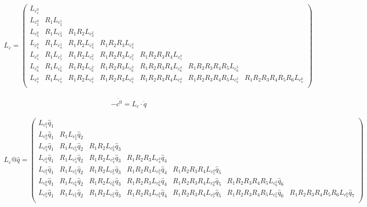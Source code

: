 {\begin{align*}
    L_c =
    \begin{pmatrix}
        L_{c_1^0} &               &                   &                       &                           &                               &   \\
        L_{c_2^0} & R_1 L_{c_2^1} &                   &                       &                           &                               &   \\
        L_{c_3^0} & R_1 L_{c_3^1} & R_1 R_2 L_{c_3^2} &                       &                           &                               &   \\
        L_{c_4^0} & R_1 L_{c_4^1} & R_1 R_2 L_{c_4^2} & R_1 R_2 R_3 L_{c_4^3} &                           &                               &   \\
        L_{c_5^0} & R_1 L_{c_5^1} & R_1 R_2 L_{c_5^2} & R_1 R_2 R_3 L_{c_5^3} & R_1 R_2 R_3 R_4 L_{c_5^4} &                               &   \\
        L_{c_6^0} & R_1 L_{c_6^1} & R_1 R_2 L_{c_6^2} & R_1 R_2 R_3 L_{c_6^3} & R_1 R_2 R_3 R_4 L_{c_6^4} & R_1 R_2 R_3 R_4 R_5 L_{c_6^5} &   \\
        L_{c_7^0} & R_1 L_{c_7^1} & R_1 R_2 L_{c_7^2} & R_1 R_2 R_3 L_{c_7^3} & R_1 R_2 R_3 R_4 L_{c_7^4} & R_1 R_2 R_3 R_4 R_5 L_{c_7^5} & R_1 R_2 R_3 R_4 R_5 R_6 L_{c_7^6} \\
    \end{pmatrix}
\end{align*}

\begin{align*}
    - \dot{c^0} = L_c \cdot \dot{q}
\end{align*}


\begin{align*}
    L_c @ \hat{q} =
    \begin{pmatrix}
        L_{c_1^0} \hat{q}_1 & & & & & &   \\
        L_{c_2^0} \hat{q}_1 & R_1 L_{c_2^1} \hat{q}_2 & & & & &   \\
        L_{c_3^0} \hat{q}_1 & R_1 L_{c_3^1} \hat{q}_2 & R_1 R_2 L_{c_3^2} \hat{q}_3 & & & &   \\
        L_{c_4^0} \hat{q}_1 & R_1 L_{c_4^1} \hat{q}_2 & R_1 R_2 L_{c_4^2} \hat{q}_3 & R_1 R_2 R_3 L_{c_4^3} \hat{q}_4 & & &   \\
        L_{c_5^0} \hat{q}_1 & R_1 L_{c_5^1} \hat{q}_2 & R_1 R_2 L_{c_5^2} \hat{q}_3 & R_1 R_2 R_3 L_{c_5^3} \hat{q}_4 & R_1 R_2 R_3 R_4 L_{c_5^4} \hat{q}_5 & &   \\
        L_{c_6^0} \hat{q}_1 & R_1 L_{c_6^1} \hat{q}_2 & R_1 R_2 L_{c_6^2} \hat{q}_3 & R_1 R_2 R_3 L_{c_6^3} \hat{q}_4 & R_1 R_2 R_3 R_4 L_{c_6^4} \hat{q}_5 & R_1 R_2 R_3 R_4 R_5 L_{c_6^5} \hat{q}_6 &   \\
        L_{c_7^0} \hat{q}_1 & R_1 L_{c_7^1} \hat{q}_2 & R_1 R_2 L_{c_7^2} \hat{q}_3 & R_1 R_2 R_3 L_{c_7^3} \hat{q}_4 & R_1 R_2 R_3 R_4 L_{c_7^4} \hat{q}_5 & R_1 R_2 R_3 R_4 R_5 L_{c_7^5} \hat{q}_6 & R_1 R_2 R_3 R_4 R_5 R_6 L_{c_7^6} \hat{q}_7 \\
    \end{pmatrix}
\end{align*}


}
